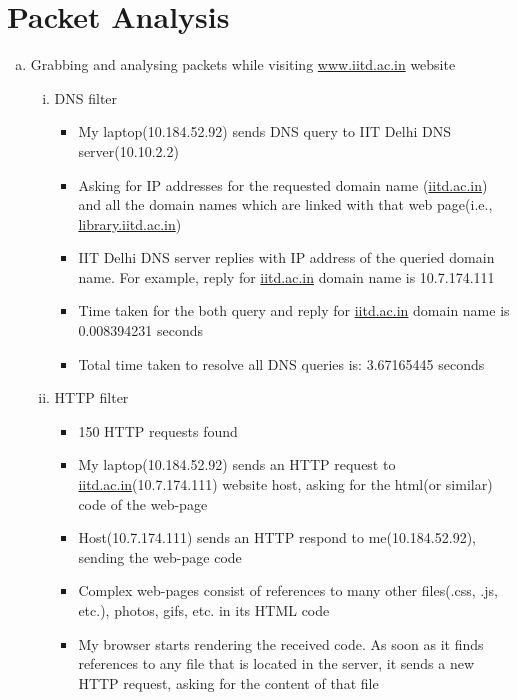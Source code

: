\documentclass{article}
\begin{document}
\section{Packet Analysis}
    \begin{enumerate}[a)]
        \item Grabbing and analysing packets while visiting \href{www.iitd.ac.in}{www.iitd.ac.in} website
            \begin{enumerate}[i)]
                \item DNS filter
                    \begin{itemize}
                        \item My laptop(10.184.52.92) sends DNS query to IIT Delhi DNS server(10.10.2.2)
                        \item Asking for IP addresses for the requested domain name (\href{www.iitd.ac.in}{iitd.ac.in}) and all the domain names which are linked with that web page(i.e., \href{www.library.iitd.ac.in}{library.iitd.ac.in})
                        \item IIT Delhi DNS server replies with IP address of the queried domain name. For example, reply for \href{www.iitd.ac.in}{iitd.ac.in} domain name is 10.7.174.111
                        \item Time taken for the both query and reply for \href{www.iitd.ac.in}{iitd.ac.in} domain name is 0.008394231 seconds
                        \item Total time taken to resolve all DNS queries is: 3.67165445 seconds
                    \end{itemize}{}
                \item HTTP filter
                    \begin{itemize}
                        \item 150 HTTP requests found
                        \item My laptop(10.184.52.92) sends an HTTP request to \href{www.iitd.ac.in}{iitd.ac.in}(10.7.174.111) website host, asking for the html(or similar) code of the web-page
                        \item Host(10.7.174.111) sends an HTTP respond to me(10.184.52.92), sending the web-page code
                        \item Complex web-pages consist of references to many other files(.css, .js, etc.), photos, gifs,  etc. in its HTML code
                        \item My browser starts rendering the received code. As soon as it finds references to any file that is located in the server, it sends a new HTTP request, asking for the content of that file

\end{itemize}
\end{enumerate}
\end{enumerate}
\end{document}
